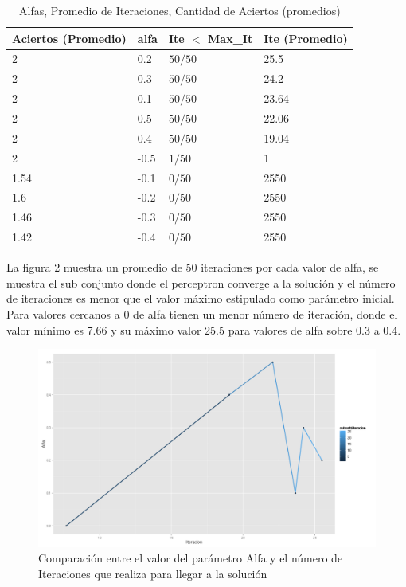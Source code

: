 \documentclass[8.5pt,twoside,twocolumn]{article}
\begin{document}
        \begin{table}[h]
        \small
        \caption{ Alfas, Promedio de Iteraciones, Cantidad de Aciertos (promedios) }
        \label{tbl:example}
        \begin{tabular*}{0.5\textwidth}{@{\extracolsep{\fill}}llll}
        \hline
        Aciertos (Promedio) & alfa & Ite $<$ Max\_It & Ite (Promedio)\\
        \hline
        2 & 0.2 & $50/50$ & 25.5 \\
        2 & 0.3 & $50/50$ & 24.2 \\
        2 & 0.1 & $50/50$ & 23.64 \\
        2 & 0.5 & $50/50$ & 22.06 \\
        2 & 0.4 & $50/50$ & 19.04  \\
        2 & -0.5 & $1/50$ & 1 \\
        1.54 & -0.1 & $0/50$ & 2550 \\
        1.6 & -0.2 & $0/50$ & 2550 \\
        1.46 & -0.3 & $0/50$ & 2550 \\
        1.42 & -0.4 & $0/50$ & 2550 \\
        \hline
        \end{tabular*}
        \end{table}

La figura 2  muestra un promedio de 50 iteraciones por cada valor de alfa, se muestra el sub conjunto donde el perceptron
converge a la soluci\'on y el n\'umero de iteraciones es menor que el valor m\'aximo estipulado como par\'ametro inicial.
Para valores cercanos a 0 de alfa tienen un menor n\'umero de iteraci\'on, donde el valor m\'inimo es 7.66 y su m\'aximo valor
25.5 para valores de alfa sobre 0.3 a 0.4. 

	\begin{figure}[h]
	  \centering
	  \includegraphics[scale=0.2]{adult_alfa_iteracion_itefinal.png}
	  \caption{Comparaci\'on entre el valor del par\'ametro Alfa y el n\'umero de Iteraciones que realiza para llegar a la soluci\'on}
	  \label{fgr:alfaIteracion}
	\end{figure}
\end{document}
